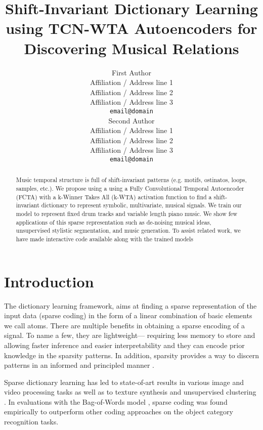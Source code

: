 \documentclass[11pt,a4paper]{article}
\title{Shift-Invariant Dictionary Learning using TCN-WTA Autoencoders for Discovering Musical Relations }
\author{First Author \\
  Affiliation / Address line 1 \\
  Affiliation / Address line 2 \\
  Affiliation / Address line 3 \\
  \texttt{email@domain} \\\And
  Second Author \\
  Affiliation / Address line 1 \\
  Affiliation / Address line 2 \\
  Affiliation / Address line 3 \\
  \texttt{email@domain} \\}
\date{}
\begin{document}
\maketitle
\begin{abstract}
Music temporal structure is full of shift-invariant patterns (e.g. motifs, ostinatos, loops, samples, etc.).  We propose using a using a Fully Convolutional Temporal Autoencoder (FCTA) with a k-Winner Takes All (k-WTA) activation function to find a shift-invariant dictionary to represent symbolic, multivariate, musical signals. We train our model to represent fixed drum tracks and variable length piano music. We show few applications of this sparse representation such as de-noising musical ideas, unsupervised stylistic segmentation, and music generation. To assist related work, we have made interactive code available along with the trained models 



\end{abstract}

\section{Introduction}

The dictionary learning framework, aims at finding a sparse representation of the input data (sparse coding) in the form of a linear combination of basic elements we call atoms. There are multiple benefits in obtaining a sparse encoding of a signal. To name a few, they are lightweight— requiring less memory to store and allowing faster inference and easier interpretability and they can encode prior knowledge in the sparsity patterns. In addition, sparsity provides a way to discern patterns in an informed and principled manner . 

 Sparse dictionary learning has led to state-of-art results in various image and video processing tasks as well as to texture synthesis \cite{Peyre2009} and unsupervised clustering \cite{Ramrez2010ClassificationAC} . In evaluations with the Bag-of-Words model \cite{7439823}, sparse coding was found empirically to outperform other coding approaches on the object category recognition tasks.  
 
\end{document}
